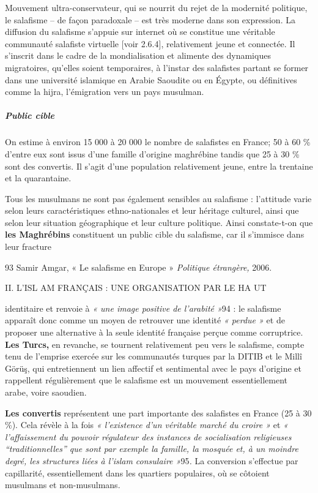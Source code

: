 Mouvement ultra-conservateur, qui se nourrit du rejet de la modernité
politique, le salafisme -- de façon paradoxale -- est très moderne dans
son expression. La diffusion du salafisme s'appuie sur internet où se
constitue une véritable communauté salafiste virtuelle {[}voir 2.6.4{]},
relativement jeune et connectée. Il s'inscrit dans le cadre de la
mondialisation et alimente des dynamiques migratoires, qu'elles soient
temporaires, à l'instar des salafistes partant se former dans une
université islamique en Arabie Saoudite ou en Égypte, ou définitives
comme la hijra, l'émigration vers un pays musulman.


\hypertarget{public-cible}{%
\subparagraph{Public cible}\label{public-cible}}


On estime à environ 15 000 à 20 000 le nombre de salafistes en France;
50 à 60 \% d'entre eux sont issus d'une famille d'origine maghrébine
tandis que 25 à 30 \% sont des convertis. Il s'agit d'une population
relativement jeune, entre la trentaine et la quarantaine.

Tous les musulmans ne sont pas également sensibles au salafisme :
l'attitude varie selon leurs caractéristiques ethno-nationales et leur
héritage culturel, ainsi que selon leur situation géographique et leur
culture politique. Ainsi constate-t-on que \textbf{les Maghrébins}
constituent un public cible du salafisme, car il s'immisce dans leur
fracture

93 Samir Amgar, « Le salafisme en Europe » \emph{Politique étrangère,}
2006.

II. L'ISL AM FRANÇAIS : UNE ORGANISATION PAR LE HA UT

identitaire et renvoie à \emph{« une image positive de l'arabité »}94 :
le salafisme apparaît donc comme un moyen de retrouver une identité
\emph{« perdue »} et de proposer une alternative à la seule identité
française perçue comme corruptrice. \textbf{Les Turcs,} en revanche, se
tournent relativement peu vers le salafisme, compte tenu de l'emprise
exercée sur les communautés turques par la DITIB et le Millî Görüş, qui
entretiennent un lien affectif et sentimental avec le pays d'origine et
rappellent régulièrement que le salafisme est un mouvement
essentiellement arabe, voire saoudien.

\textbf{Les convertis} représentent une part importante des salafistes
en France (25 à 30 \%). Cela révèle à la fois \emph{« l'existence d'un
véritable marché du croire »} et \emph{« l'affaissement du pouvoir
régulateur des instances de socialisation religieuses
``traditionnelles'' que sont par exemple la famille, la mosquée et, à un
moindre degré, les structures liées à l'islam consulaire »}95\emph{.} La
conversion s'effectue par capillarité, essentiellement dans les
quartiers populaires, où se côtoient musulmans et non-musulmans.


